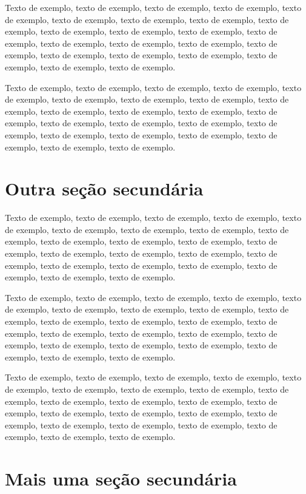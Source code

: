 \documentclass[
	12pt,				%
	oneside,			%
	a4paper,			%
	english,			%
	brazil				%
	]{abntex2ppgsi}
\begin{document}
Texto de exemplo, texto de exemplo, texto de exemplo, texto de exemplo, texto de exemplo, texto de exemplo, texto de exemplo, texto de exemplo, texto de exemplo, texto de exemplo, texto de exemplo, texto de exemplo, texto de exemplo, texto de exemplo, texto de exemplo, texto de exemplo, texto de exemplo, texto de exemplo, texto de exemplo, texto de exemplo, texto de exemplo, texto de exemplo, texto de exemplo.

Texto de exemplo, texto de exemplo, texto de exemplo, texto de exemplo, texto de exemplo, texto de exemplo, texto de exemplo, texto de exemplo, texto de exemplo, texto de exemplo, texto de exemplo, texto de exemplo, texto de exemplo, texto de exemplo, texto de exemplo, texto de exemplo, texto de exemplo, texto de exemplo, texto de exemplo, texto de exemplo, texto de exemplo, texto de exemplo, texto de exemplo.

\section{Outra seção secundária}

Texto de exemplo, texto de exemplo, texto de exemplo, texto de exemplo, texto de exemplo, texto de exemplo, texto de exemplo, texto de exemplo, texto de exemplo, texto de exemplo, texto de exemplo, texto de exemplo, texto de exemplo, texto de exemplo, texto de exemplo, texto de exemplo, texto de exemplo, texto de exemplo, texto de exemplo, texto de exemplo, texto de exemplo, texto de exemplo, texto de exemplo.

Texto de exemplo, texto de exemplo, texto de exemplo, texto de exemplo, texto de exemplo, texto de exemplo, texto de exemplo, texto de exemplo, texto de exemplo, texto de exemplo, texto de exemplo, texto de exemplo, texto de exemplo, texto de exemplo, texto de exemplo, texto de exemplo, texto de exemplo, texto de exemplo, texto de exemplo, texto de exemplo, texto de exemplo, texto de exemplo, texto de exemplo.

Texto de exemplo, texto de exemplo, texto de exemplo, texto de exemplo, texto de exemplo, texto de exemplo, texto de exemplo, texto de exemplo, texto de exemplo, texto de exemplo, texto de exemplo, texto de exemplo, texto de exemplo, texto de exemplo, texto de exemplo, texto de exemplo, texto de exemplo, texto de exemplo, texto de exemplo, texto de exemplo, texto de exemplo, texto de exemplo, texto de exemplo.

\section{Mais uma seção secundária}
\end{document}
